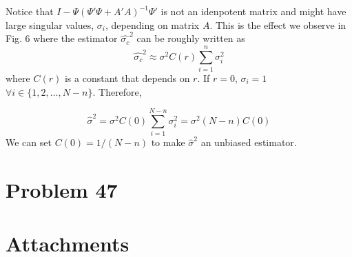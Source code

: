 \documentclass[a4paper, 11pt]{article}
\begin{document}
Notice that $I - \Psi\left(\Psi'\Psi + A'A \right)^{-1}\Psi'$ is not an idenpotent matrix and might have large singular values, $\sigma_i$, depending on matrix $A$. This is the effect we observe in Fig. 6 where the estimator $\hat{\sigma_c}^2$ can be roughly written as
\begin{equation}
\hat{\sigma_c}^2 \approx \sigma^2 C(r)\sum_{i=1}^n \sigma_i^2
\end{equation}
where $C(r)$ is a constant that depends on $r$. If $r = 0$, $\sigma_i = 1$ $\forall i \in \{1,2,\dots, N-n \}$. Therefore, 

\begin{equation}
\hat{\sigma}^2 = \sigma^2 C(0)\sum_{i=1}^{N-n} \sigma_i^2 = \sigma^2(N-n)C(0)
\end{equation}
We can set $C(0) = 1/(N-n)$ to make $\hat{\sigma}^2$ an unbiased estimator. 



\section*{Problem 47}



 







\section*{Attachments}
	
\end{document}
